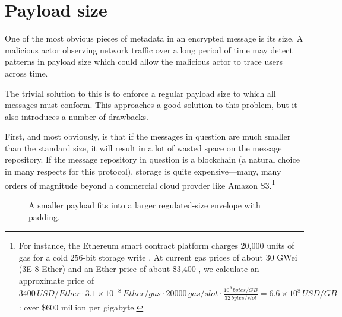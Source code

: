 \section{Payload size}\label{payload-size}

One of the most obvious pieces of metadata in an encrypted message is its size. A malicious actor observing network traffic over a long period of time may detect patterns in payload size which could allow the malicious actor to trace users across time.

The trivial solution to this is to enforce a regular payload size to which all messages must conform. This approaches a good solution to this problem, but it also introduces a number of drawbacks.

First, and most obviously, is that if the messages in question are much smaller than the standard size, it will result in a lot of wasted space on the message repository. If the message repository in question is a blockchain (a natural choice in many respects for this protocol), storage is quite expensive---many, many orders of magnitude beyond a commercial cloud provder like Amazon S3.\footnote{For instance, the Ethereum smart contract platform  charges 20,000 units of gas for a cold 256-bit storage write \parencite[][Appendix G]{wood_ethereum_2025}. At current gas prices of about 30 GWei (3E-8 Ether) \parencite{etherscanio_gastracker} and an Ether price of about \$3,400 \parencite{coingecko_ethereum_2025}, we calculate an approximate price of $3400 \si{\,USD\per Ether} \cdot 3.1 \times 10^{-8} \si{\,Ether\per gas} \cdot 20000 \si{\,gas\per slot} \cdot \frac{10^9 \si{\,bytes\per GB}}{32 \si{\,bytes\per slot}} = 6.6 \times 10^8 \si{\,USD\per GB}$: over \$600 million per gigabyte.}

\begin{figure}[h]
    \centering
    \caption{A smaller payload fits into a larger regulated-size envelope with padding.}
    \label{fig:payload_size}
\end{figure}

